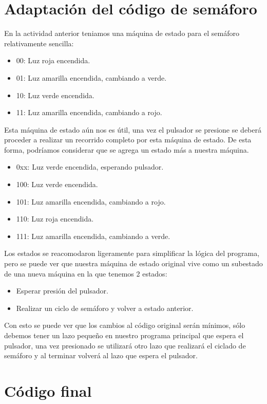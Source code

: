 \documentclass{article}
\begin{document}
\section{Adaptación del código de semáforo}

En la actividad anterior teniamos una máquina de estado para el semáforo
relativamente sencilla:

\begin{itemize}
    \item 00: Luz roja encendida.
    \item 01: Luz amarilla encendida, cambiando a verde.
    \item 10: Luz verde encendida.
    \item 11: Luz amarilla encendida, cambiando a rojo.
\end{itemize}

Esta máquina de estado aún nos es útil, una vez el pulsador se presione se
deberá proceder a realizar un recorrido completo por esta máquina de estado.
De esta forma, podríamos considerar que se agrega un estado más a nuestra
máquina.

\begin{itemize}
    \item 0xx: Luz verde encendida, esperando pulsador.
    \item 100: Luz verde encendida.
    \item 101: Luz amarilla encendida, cambiando a rojo.
    \item 110: Luz roja encendida.
    \item 111: Luz amarilla encendida, cambiando a verde.
\end{itemize}

Los estados se reacomodaron ligeramente para simplificar la lógica del
programa, pero se puede ver que nuestra máquina de estado original vive como
un subestado de una nueva máquina en la que tenemos 2 estados:

\begin{itemize}
    \item Esperar presión del pulsador.
    \item Realizar un ciclo de semáforo y volver a estado anterior.
\end{itemize}

Con esto se puede ver que los cambios al código original serán mínimos, sólo
debemos tener un lazo pequeño en nuestro programa principal que espera el
pulsador, una vez presionado se utilizará otro lazo que realizará el ciclado
de semáforo y al terminar volverá al lazo que espera el pulsador.

\section{Código final}

\end{document}
